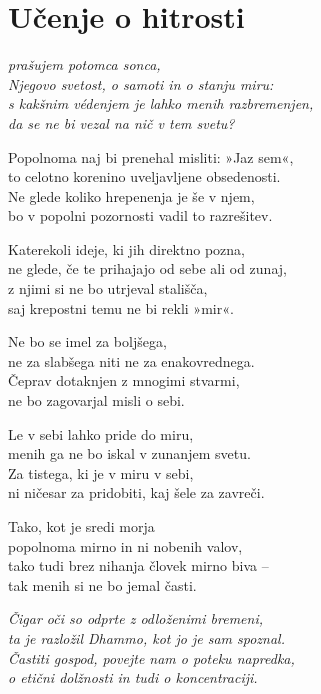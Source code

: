 \cleartorecto
{}
\chapter{Učenje o hitrosti}

\emph{prašujem potomca sonca,\\
Njegovo svetost, o samoti in o stanju miru:\\
s kakšnim védenjem je lahko menih razbremenjen,\\
da se ne bi vezal na nič v tem svetu?}

Popolnoma naj bi prenehal misliti: »Jaz sem«,\\
to celotno korenino uveljavljene obsedenosti.\\
Ne glede koliko hrepenenja je še v njem,\\
bo v popolni pozornosti vadil to razrešitev.

\clearpage

Katerekoli ideje, ki jih direktno pozna,\\
ne glede, če te prihajajo od sebe ali od zunaj,\\
z njimi si ne bo utrjeval stališča,\\
saj krepostni temu ne bi rekli »mir«.

Ne bo se imel za boljšega,\\
ne za slabšega niti ne za enakovrednega.\\
Čeprav dotaknjen z mnogimi stvarmi,\\
ne bo zagovarjal misli o sebi.

Le v sebi lahko pride do miru,\\
menih ga ne bo iskal v zunanjem svetu.\\
Za tistega, ki je v miru v sebi,\\
ni ničesar za pridobiti, kaj šele za zavreči.

Tako, kot je sredi morja\\
popolnoma mirno in ni nobenih valov,\\
tako tudi brez nihanja človek mirno biva --\\
tak menih si ne bo jemal časti.

\emph{Čigar oči so odprte z odloženimi bremeni,}\\
\emph{ta je razložil Dhammo, kot jo je sam spoznal.}\\
\emph{Častiti gospod, povejte nam o poteku napredka,}\\
\emph{o etični dolžnosti in tudi o koncentraciji.}

